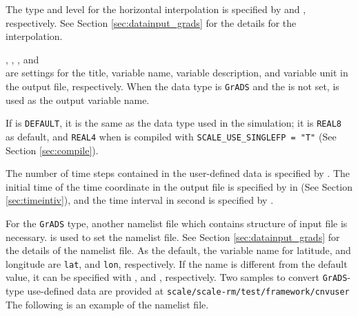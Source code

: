 The type and level for the horizontal interpolation is specified by  and , respectively.
See Section \ref{sec:datainput_grads} for the details for the interpolation.

, , , and \\
 are settings for the title, variable name, variable description, and variable unit in the output file, respectively.
When the data type is \verb|GrADS| and the  is not set,  is used as the output variable name.

If  is \verb|DEFAULT|, it is the same as the data type used in the simulation;
it is \verb|REAL8| as default, and \verb|REAL4| when \scalerm is compiled with \verb|SCALE_USE_SINGLEFP = "T"| (See Section \ref{sec:compile}).

The number of time steps contained in the user-defined data is specified by .
The initial time of the time coordinate in the output file is specified by  in  (See Section \ref{sec:timeintiv}), and the time interval in second is specified by .



For the \verb|GrADS| type, another namelist file which contains structure of input file is necessary.
 is used to set the namelist file.
See Section \ref{sec:datainput_grads} for the details of the namelist file.
As the default, the variable name for latitude, and longitude are \verb|lat|, and \verb|lon|, respectively.
If the name is different from the default value, it can be specified with , and , respectively.
Two samples to convert \verb|GrADS|-type use-defined data are provided at \verb|scale/scale-rm/test/framework/cnvuser|
The following is an example of the namelist file.



